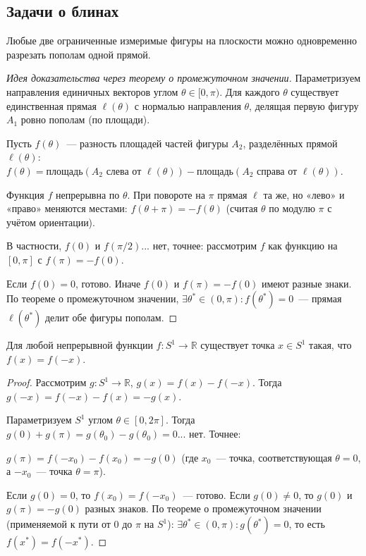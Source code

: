 \documentclass[12pt]{article}
\begin{document}
	\subsection{Задачи о блинах}
	
	\begin{theorem}
		Любые две ограниченные измеримые фигуры на плоскости можно одновременно разрезать пополам одной прямой.
	\end{theorem}
	
	\begin{proof}[Идея доказательства через теорему о промежуточном значении]
		Параметризуем направления единичных векторов углом $\theta \in [0, \pi)$. Для каждого $\theta$ существует единственная прямая $\ell(\theta)$ с нормалью направления $\theta$, делящая первую фигуру $A_1$ ровно пополам (по площади).
		
		Пусть $f(\theta)$~--- разность площадей частей фигуры $A_2$, разделённых прямой $\ell(\theta)$: $f(\theta) = \text{площадь}(A_2 \text{ слева от } \ell(\theta)) - \text{площадь}(A_2 \text{ справа от } \ell(\theta))$.
		
		Функция $f$ непрерывна по $\theta$. При повороте на $\pi$ прямая $\ell$ та же, но «лево» и «право» меняются местами: $f(\theta + \pi) = -f(\theta)$ (считая $\theta$ по модулю $\pi$ с учётом ориентации).
		
		В частности, $f(0)$ и $f(\pi/2)$... нет, точнее: рассмотрим $f$ как функцию на $[0, \pi]$ с $f(\pi) = -f(0)$.
		
		Если $f(0) = 0$, готово. Иначе $f(0)$ и $f(\pi) = -f(0)$ имеют разные знаки. По теореме о промежуточном значении, $\exists \theta^* \in (0, \pi): f(\theta^*) = 0$~--- прямая $\ell(\theta^*)$ делит обе фигуры пополам.
	\end{proof}
	
	\begin{theorem}
		Для любой непрерывной функции $f: S^1 \to \mathbb{R}$ существует точка $x \in S^1$ такая, что $f(x) = f(-x)$.
	\end{theorem}
	
	\begin{proof}
		Рассмотрим $g: S^1 \to \mathbb{R}$, $g(x) = f(x) - f(-x)$. Тогда $g(-x) = f(-x) - f(x) = -g(x)$.
		
		Параметризуем $S^1$ углом $\theta \in [0, 2\pi]$. Тогда $g(0) + g(\pi) = g(\theta_0) - g(\theta_0) = 0$... нет. Точнее:
		
		$g(\pi) = f(-x_0) - f(x_0) = -g(0)$ (где $x_0$~--- точка, соответствующая $\theta = 0$, а $-x_0$~--- точка $\theta = \pi$).
		
		Если $g(0) = 0$, то $f(x_0) = f(-x_0)$~--- готово. Если $g(0) \neq 0$, то $g(0)$ и $g(\pi) = -g(0)$ разных знаков. По теореме о промежуточном значении (применяемой к пути от $0$ до $\pi$ на $S^1$): $\exists \theta^* \in (0, \pi): g(\theta^*) = 0$, то есть $f(x^*) = f(-x^*)$.
	\end{proof}
	
\end{document}
